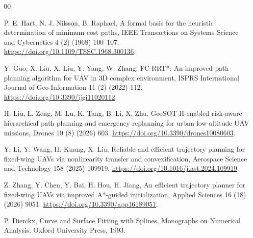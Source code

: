 \begin{thebibliography}{00}

P. E. Hart, N. J. Nilsson, B. Raphael,
A formal basis for the heuristic determination of minimum cost paths,
IEEE Transactions on Systems Science and Cybernetics 4 (2) (1968) 100--107.
\url{https://doi.org/10.1109/TSSC.1968.300136}.

Y. Guo, X. Liu, X. Liu, Y. Yang, W. Zhang,
FC-RRT*: An improved path planning algorithm for UAV in 3D complex environment,
ISPRS International Journal of Geo-Information 11 (2) (2022) 112.
\url{https://doi.org/10.3390/ijgi11020112}.

H. Liu, L. Zeng, M. Lu, K. Tang, B. Li, X. Zhu,
GeoSOT-H-enabled risk-aware hierarchical path planning and emergency
replanning for urban low-altitude UAV missions,
Drones 10 (8) (2026) 603.
\url{https://doi.org/10.3390/drones10080603}.

Y. Li, Y. Wang, H. Kuang, X. Liu,
Reliable and efficient trajectory planning for fixed-wing UAVs via
nonlinearity transfer and convexification,
Aerospace Science and Technology 158 (2025) 109919.
\url{https://doi.org/10.1016/j.ast.2024.109919}.

Z. Zhang, Y. Chen, Y. Bai, H. Hou, H. Jiang,
An efficient trajectory planner for fixed-wing UAVs via improved
A*-guided initialization,
Applied Sciences 16 (18) (2026) 9051.
\url{https://doi.org/10.3390/app16189051}.

P. Dierckx, Curve and Surface Fitting with Splines,
Monographs on Numerical Analysis, Oxford University Press, 1993.

\end{thebibliography}
